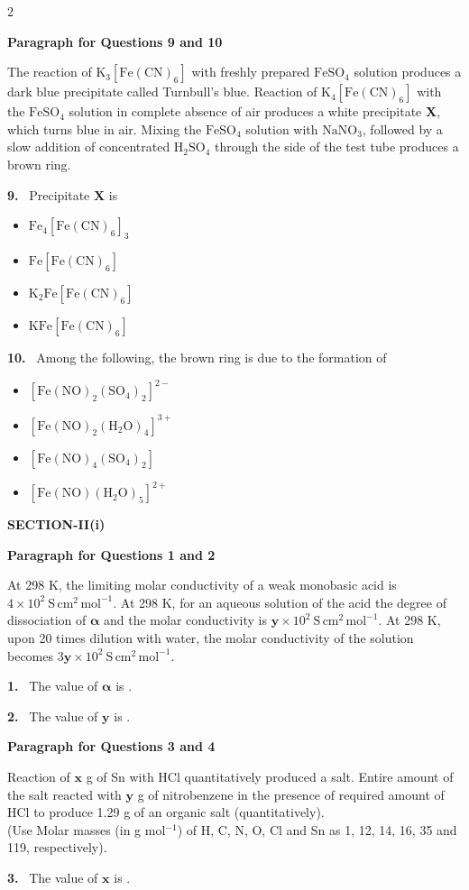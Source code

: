 \documentclass[10pt]{extarticle}
\newcommand{\sect}[1]{\par\smallskip\noindent\textbf{#1}\par}
\newcommand{\qn}[1]{\par\smallskip\noindent\textbf{#1.}~}
\newcommand{\paraq}[2]{\par\smallskip\noindent\textbf{Paragraph for Questions #1 and #2}\par}
\newenvironment{qoptions}{\begin{itemize}[leftmargin=1.8em,itemsep=1pt,topsep=2pt,label={}]}{\end{itemize}}
\newcommand{\opt}[2]{\item[(#1)] #2}
\begin{document}
\begin{multicols}{2}
\paraq{9}{10}
The reaction of $\mathrm{K_3[Fe(CN)_6]}$ with freshly prepared $\mathrm{FeSO_4}$ solution produces a dark blue precipitate called Turnbull's blue. Reaction of $\mathrm{K_4[Fe(CN)_6]}$ with the $\mathrm{FeSO_4}$ solution in complete absence of air produces a white precipitate \textbf{X}, which turns blue in air. Mixing the $\mathrm{FeSO_4}$ solution with $\mathrm{NaNO_3}$, followed by a slow addition of concentrated $\mathrm{H_2SO_4}$ through the side of the test tube produces a brown ring.

\qn{9} Precipitate \textbf{X} is
\begin{qoptions}
\opt{A}{$\mathrm{Fe_4[Fe(CN)_6]_3}$}
\opt{B}{$\mathrm{Fe[Fe(CN)_6]}$}
\opt{C}{$\mathrm{K_2Fe[Fe(CN)_6]}$}
\opt{D}{$\mathrm{KFe[Fe(CN)_6]}$}
\end{qoptions}

\qn{10} Among the following, the brown ring is due to the formation of
\begin{qoptions}
\opt{A}{$[\mathrm{Fe(NO)_2(SO_4)_2}]^{2-}$}
\opt{B}{$[\mathrm{Fe(NO)_2(H_2O)_4}]^{3+}$}
\opt{C}{$[\mathrm{Fe(NO)_4(SO_4)_2}]$}
\opt{D}{$[\mathrm{Fe(NO)(H_2O)_5}]^{2+}$}
\end{qoptions}

\sect{SECTION-II(i)}
\paraq{1}{2}
At 298 K, the limiting molar conductivity of a weak monobasic acid is $4\times10^2\ \mathrm{S\,cm^2\,mol^{-1}}$. At 298 K, for an aqueous solution of the acid the degree of dissociation of $\boldsymbol\alpha$ and the molar conductivity is $\mathbf y\times10^2\ \mathrm{S\,cm^2\,mol^{-1}}$. At 298 K, upon 20 times dilution with water, the molar conductivity of the solution becomes $3\mathbf y\times10^2\ \mathrm{S\,cm^2\,mol^{-1}}$.

\qn{1} The value of $\boldsymbol\alpha$ is \underline{\hspace{2.5em}}.

\qn{2} The value of $\mathbf y$ is \underline{\hspace{2.5em}}.

\paraq{3}{4}
Reaction of $\mathbf x$ g of Sn with HCl quantitatively produced a salt. Entire amount of the salt reacted with $\mathbf y$ g of nitrobenzene in the presence of required amount of HCl to produce 1.29 g of an organic salt (quantitatively).\\
(Use Molar masses (in g mol$^{-1}$) of H, C, N, O, Cl and Sn as 1, 12, 14, 16, 35 and 119, respectively).

\qn{3} The value of $\mathbf x$ is \underline{\hspace{2.5em}}.


\end{multicols}
\end{document}
